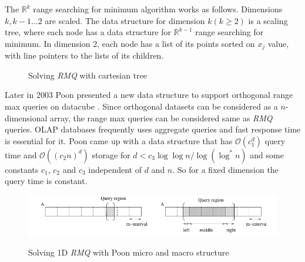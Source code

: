 The $\mathbb{R}^k$ range searching for minimum algorithm works as follows. Dimensions $k,k-1 \ldots 2$ are scaled. The data structure for dimension $k (k \geq 2)$ is a scaling tree, where each node has a data structure for $\mathbb{R}^{k-1}$ range searching for minimum. In dimension 2, each node has a list of its points sorted on $x_j$ value, with line pointers to the lists of its children.\\

\begin{figure}[H]%
    \centering
    \qquad
    \caption{Solving \emph{RMQ} with cartesian tree \cite{wiki:xxx}}%
\end{figure}

Later in 2003 Poon presented a new data structure to support orthogonal range max queries on datacube \cite{p6}. Since orthogonal datasets can be considered as a $n$-dimensional array, the range max queries can be considered same as \emph{RMQ} queries. OLAP databases frequently uses aggregate queries and fast response time is essential for it. Poon came up with a data structure that has $\mathcal{O}(c^d_1)$ query time and $\mathcal{O}((c_2n)^d)$ storage for $d < c_3 \log \log n / \log(\log^* n)$ and some constants $c_1$, $c_2$ and $c_3$ independent of $d$ and $n$. So for a fixed dimension the query time is constant.  \\

\begin{figure}[H]%
    \centering
    {\includegraphics[width=14cm,]{img/poon.png} }
    \caption{Solving 1D \emph{RMQ} with Poon micro and macro structure \cite{p6}}%
    \label{fig:poon1d}%
\end{figure}


